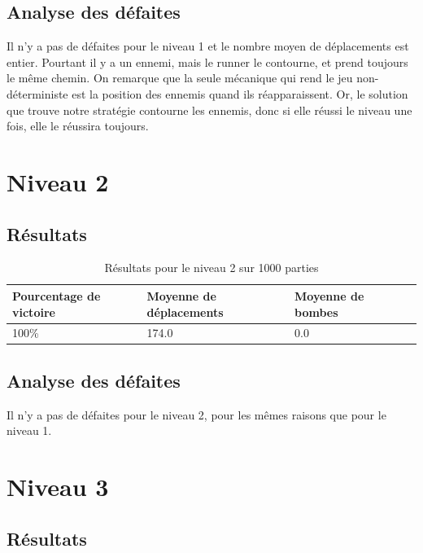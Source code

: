 \subsection{Analyse des défaites}

Il n'y a pas de défaites pour le niveau 1 et le nombre moyen de déplacements est entier.
Pourtant il y a un ennemi, mais le runner le contourne, et prend toujours le même chemin.
\newline
On remarque que la seule mécanique qui rend le jeu non-déterministe est la position des ennemis quand ils réapparaissent.
Or, le solution que trouve notre stratégie contourne les ennemis, donc si elle réussi le niveau une fois, elle le réussira toujours.

\section{Niveau 2}

\subsection{Résultats}

\begin{table}[!htpb]
    \begin{tabularx}{\textwidth}{lXXX}
        \toprule
        Pourcentage de victoire & Moyenne de déplacements & Moyenne de bombes \\
        \midrule
        100\% & 174.0 & 0.0 \\
        \bottomrule
    \end{tabularx}
    \caption{Résultats pour le niveau 2 sur 1000 parties}
    \label{tab:res-niveau-2}
\end{table}

\subsection{Analyse des défaites}

Il n'y a pas de défaites pour le niveau 2, pour les mêmes raisons que pour le niveau 1.

\section{Niveau 3}

\subsection{Résultats}

